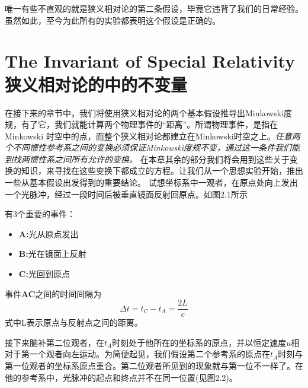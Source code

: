 唯一有些不直观的就是狭义相对论的第二条假设，毕竟它违背了我们的日常经验。虽然如此，至今为此所有的实验都表明这个假设是正确的。
\section[狭义相对论的中的不变量]{The Invariant of Special Relativity 狭义相对论的中的不变量}
\label{sec2.1}
在接下来的章节中，我们将使用狭义相对论的两个基本假设推导出Minkowski度规，有了它，我们就能计算两个物理事件的“距离”。所谓物理事件，是指在Minkowski 时空中的点，而整个狭义相对论都建立在Minkowski时空之上。{\it{任意两个不同惯性参考系之间的变换必须保证Minkowski度规不变，通过这一条件我们能到找两惯性系之间所有允许的变换。}}
在本章其余的部分我们将会用到这些关于变换的知识，来寻找在这些变换下都成立的方程。让我们从一个思想实验开始，推出一些从基本假设出发得到的重要结论。
{}
试想坐标系中一观者，在原点处向上发出一个光脉冲，经过一段时间后被垂直镜面反射回原点。如图2.1所示

有3个重要的事件：
\begin{itemize}
  \item {\bf{A:}}光从原点发出
  \item {\bf{B:}}光在镜面上反射
  \item {\bf{C:}}光回到原点
\end{itemize}
事件{\bf{AC}}之间的时间间隔为
\begin{equation}\label{eq2.1}
\Delta t=t_C-t_A=\frac{2L}{c}
\end{equation}
式中L表示原点与反射点之间的距离。

{}


接下来脑补第二位观者，在$t_A$时刻处于他所在的坐标系的原点，并以恒定速度$u$相对于第一个观者向左运动。为简便起见，我们假设第二个参考系的原点在$t_A$时刻与第一位观者的坐标系原点重合。第二位观者所见到的现象就与第一位不一样了。在他的参考系中，光脉冲的起点和终点并不在同一位置(见图2.2)。

